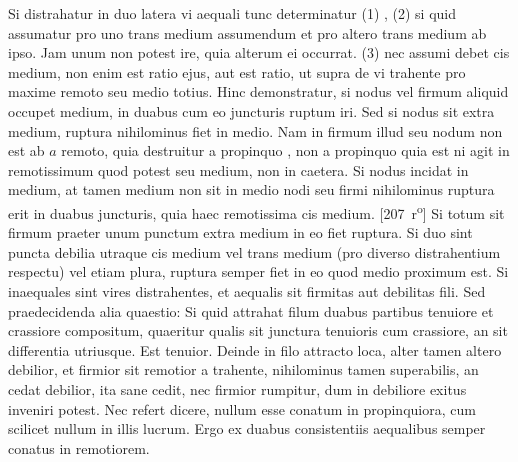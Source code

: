 \hspace*{7.5mm}Si distrahatur in duo latera vi\protect{} aequali tunc determinatur (1) , (2) si quid assumatur pro uno trans medium assumendum et pro altero trans medium ab ipso. Jam unum non potest ire, quia alterum ei occurrat. (3) nec assumi debet cis medium, non enim est ratio ejus, aut est ratio, ut  supra de vi trahente pro  maxime remoto seu medio totius. Hinc demonstratur, si nodus vel firmum aliquid occupet medium, in duabus cum eo juncturis ruptum iri. Sed si nodus sit extra medium, ruptura\protect{} nihilominus fiet in medio. Nam in firmum illud seu nodum non est  ab $a$ remoto, quia destruitur a propinquo , non a propinquo quia est ni agit in remotissimum quod potest seu medium, non in caetera. Si nodus incidat in medium, at tamen medium non sit in medio nodi\protect{} seu firmi nihilominus ruptura\protect{} erit in duabus juncturis, quia haec remotissima  cis medium.
[207~r\textsuperscript{o}]
\pend
\pstart%
Si totum sit firmum praeter unum punctum extra medium in eo fiet ruptura\protect{}. Si duo sint puncta debilia utraque cis medium vel trans medium (pro diverso distrahentium respectu) vel etiam plura, ruptura\protect{} semper fiet in eo quod medio proximum est.
\pend
\pstart
Si inaequales sint vires distrahentes, et aequalis sit firmitas aut debilitas fili.
Sed praedecidenda alia quaestio:
Si quid attrahat filum\protect{}  duabus partibus tenuiore et crassiore compositum, quaeritur qualis sit junctura tenuioris cum crassiore, an sit differentia utriusque. Est tenuior. 
\pend 
\pstart Deinde  in filo attracto loca, alter tamen altero debilior, et firmior sit remotior a trahente, nihilominus tamen superabilis, an cedat debilior, ita sane cedit, nec firmior rumpitur, dum in debiliore exitus inveniri potest. Nec refert dicere, nullum esse conatum in propinquiora, cum scilicet nullum in illis lucrum. Ergo ex duabus consistentiis aequalibus semper conatus in remotiorem.
